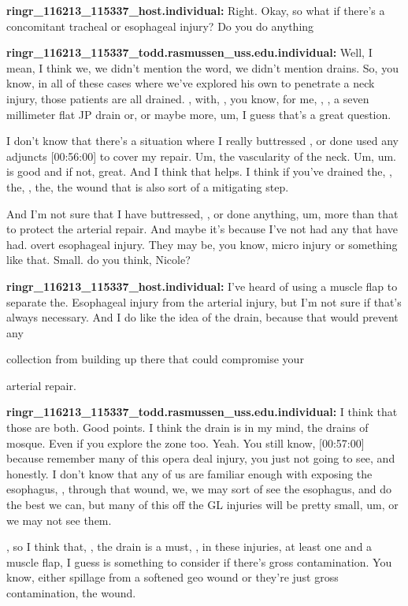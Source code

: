 \documentclass[
]{book}
\begin{document}
\textbf{ringr\_116213\_115337\_host.individual:} Right. Okay, so what if there's
a concomitant tracheal or esophageal injury? Do you do anything

\textbf{ringr\_116213\_115337\_todd.rasmussen\_uss.edu.individual:} Well, I mean,
I think we, we didn't mention the word, we didn't mention drains. So,
you know, in all of these cases where we've explored his own to
penetrate a neck injury, those patients are all drained. , with, , you
know, for me, , , a seven millimeter flat JP drain or, or maybe more,
um, I guess that's a great question.

I don't know that there's a situation where I really buttressed , or
done used any adjuncts {[}00:56:00{]} to cover my repair. Um, the
vascularity of the neck. Um, um. is good and if not, great. And I think
that helps. I think if you've drained the, , the, , the, the wound that
is also sort of a mitigating step.

And I'm not sure that I have buttressed, , or done anything, um, more
than that to protect the arterial repair. And maybe it's because I've
not had any that have had. overt esophageal injury. They may be, you
know, micro injury or something like that. Small. do you think, Nicole?

\textbf{ringr\_116213\_115337\_host.individual:} I've heard of using a muscle
flap to separate the. Esophageal injury from the arterial injury, but
I'm not sure if that's always necessary. And I do like the idea of the
drain, because that would prevent any

collection from building up there that could compromise your

arterial repair.

\textbf{ringr\_116213\_115337\_todd.rasmussen\_uss.edu.individual:} I think that
those are both. Good points. I think the drain is in my mind, the drains
of mosque. Even if you explore the zone too. Yeah. You still know,
{[}00:57:00{]} because remember many of this opera deal injury, you just not
going to see, and honestly. I don't know that any of us are familiar
enough with exposing the esophagus, , through that wound, we, we may
sort of see the esophagus, and do the best we can, but many of this off
the GL injuries will be pretty small, um, or we may not see them.

, so I think that, , the drain is a must, , in these injuries, at least
one and a muscle flap, I guess is something to consider if there's gross
contamination. You know, either spillage from a softened geo wound or
they're just gross contamination, the wound.
\end{document}
